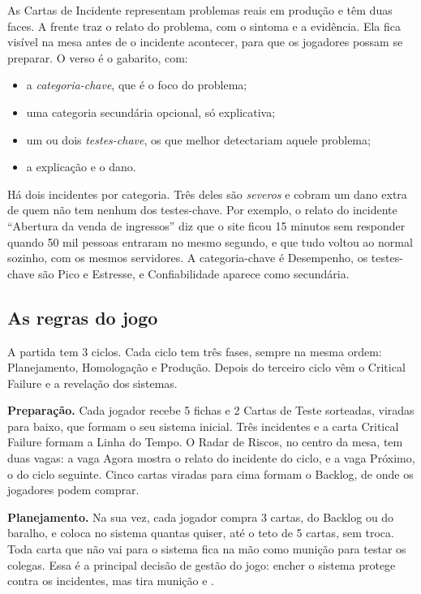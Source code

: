 As Cartas de Incidente representam problemas reais em produção e têm duas faces. A frente traz o relato do
problema, com o sintoma e a evidência. Ela fica visível na mesa antes de o incidente acontecer, para que os
jogadores possam se preparar. O verso é o gabarito, com:
\begin{itemize}
  \item a \emph{categoria-chave}, que é o foco do problema;
  \item uma categoria secundária opcional, só explicativa;
  \item um ou dois \emph{testes-chave}, os que melhor detectariam aquele problema;
  \item a explicação e o dano.
\end{itemize}
Há dois incidentes por categoria. Três deles são \emph{severos} e cobram um dano extra de quem não tem nenhum dos
testes-chave. Por exemplo, o relato do incidente ``Abertura da venda de ingressos'' diz que o site ficou 15
minutos sem responder quando 50 mil pessoas entraram no mesmo segundo, e que tudo voltou ao normal sozinho, com
os mesmos servidores. A categoria-chave é Desempenho, os testes-chave são Pico e Estresse, e Confiabilidade
aparece como secundária.

\subsection{As regras do jogo}
\label{sec:regras}

A partida tem 3 ciclos. Cada ciclo tem três fases, sempre na mesma ordem: Planejamento, Homologação e Produção.
Depois do terceiro ciclo vêm o Critical Failure e a revelação dos sistemas.

\textbf{Preparação.} Cada jogador recebe 5 fichas e 2 Cartas de Teste sorteadas, viradas para baixo, que formam o
seu sistema inicial. Três incidentes e a carta Critical Failure formam a Linha do Tempo. O Radar de Riscos, no
centro da mesa, tem duas vagas: a vaga Agora mostra o relato do incidente do ciclo, e a vaga Próximo, o do ciclo
seguinte. Cinco cartas viradas para cima formam o Backlog, de onde os jogadores podem comprar.

\textbf{Planejamento.} Na sua vez, cada jogador compra 3 cartas, do Backlog ou do baralho, e coloca no sistema
quantas quiser, até o teto de 5 cartas, sem troca. Toda carta que não vai para o sistema fica na mão como munição
para testar os colegas. Essa é a principal decisão de gestão do jogo: encher o sistema protege contra os
incidentes, mas tira munição e .

